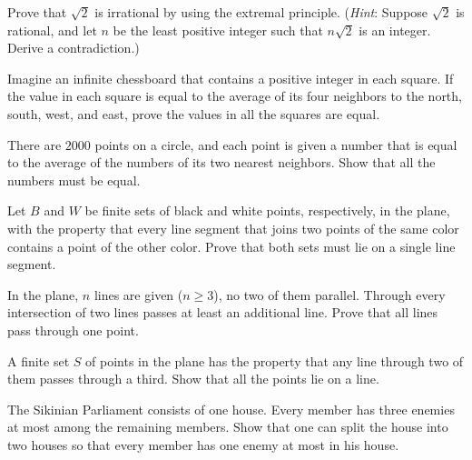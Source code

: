 \documentclass[12pt]{article}
\begin{document}
        \begin{exercise}
            Prove that $\sqrt{2}$ is irrational by using the extremal principle. (\emph{Hint}: Suppose $\sqrt{2}$ is rational, and let $n$ be the least positive integer such that $n\sqrt{2}$ is an integer. Derive a contradiction.)
        \end{exercise}
        
        \begin{exercise}
            Imagine an infinite chessboard that contains a positive integer in each square. If the value in each square is equal to the average of its four neighbors to the north, south, west, and east, prove the values in all the squares are equal. 
        \end{exercise}
        
        \begin{exercise}
            There are $2000$ points on a circle, and each point is given a number that is equal to the average of the numbers of its two nearest neighbors. Show that all the numbers must be equal.
        \end{exercise}
        
        \begin{exercise}
           Let $B$ and $W$ be finite sets of black and white points, respectively, in the plane, with the property that every line segment that joins two points of the same color contains a point of the other color. Prove that both sets must lie on a single line segment.
        \end{exercise}
        
        \begin{exercise}
            In the plane, $n$ lines are given ($n \geq 3$), no two of them parallel. Through every intersection of two lines passes at least an additional line. Prove that all lines pass through one point. 
        \end{exercise}
        
        
        \begin{exercise}
            A finite set $S$ of points in the plane has the property that any line through two of them passes through a third. Show that all the points lie on a line. 
        \end{exercise}
        
        \begin{exercise}
            The Sikinian Parliament consists of one house. Every member has three enemies at most among the remaining members. Show that one can split the house into two houses so that every member has one enemy at most in his house. 
        \end{exercise}
\end{document}
